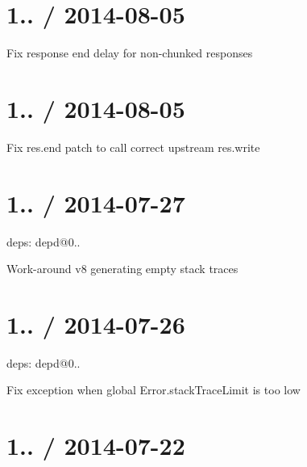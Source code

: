 \section*{1.. / 2014-\/08-\/05 }


\begin{DoxyItemize}
\item Fix response end delay for non-\/chunked responses
\end{DoxyItemize}

\section*{1.. / 2014-\/08-\/05 }


\begin{DoxyItemize}
\item Fix {\ttfamily res.\+end} patch to call correct upstream {\ttfamily res.\+write}
\end{DoxyItemize}

\section*{1.. / 2014-\/07-\/27 }


\begin{DoxyItemize}
\item deps\+: depd@0..
\begin{DoxyItemize}
\item Work-\/around v8 generating empty stack traces
\end{DoxyItemize}
\end{DoxyItemize}

\section*{1.. / 2014-\/07-\/26 }


\begin{DoxyItemize}
\item deps\+: depd@0..
\begin{DoxyItemize}
\item Fix exception when global {\ttfamily Error.\+stack\+Trace\+Limit} is too low
\end{DoxyItemize}
\end{DoxyItemize}

\section*{1.. / 2014-\/07-\/22 }


